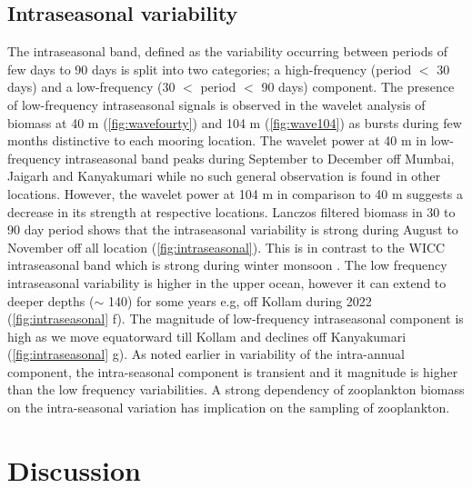 \documentclass{article}
\begin{document}
	\subsection{Intraseasonal variability}
    The intraseasonal band, defined as the variability occurring between periods of few days to 90 days is split into two categories; a high-frequency (period $<$ 30 days) and a low-frequency (30 $<$ period $<$ 90 days) component. The presence of low-frequency intraseasonal signals is observed in the wavelet analysis of biomass at 40 m (\cref{fig:wavefourty}) and 104 m (\cref{fig:wave104}) as bursts during few months distinctive to each mooring location. The wavelet power at 40 m in low-frequency intraseasonal band peaks during September to December off Mumbai, Jaigarh and Kanyakumari while no such general observation is found in other locations. However, the wavelet power at 104 m in comparison to 40 m suggests a decrease in its strength at respective locations. Lanczos filtered biomass in 30 to 90 day period shows that the intraseasonal variability is strong during August to November off all location (\cref{fig:intraseasonal}). This is in contrast to the WICC intraseasonal band which is strong during winter monsoon \citep{amol2014observed, chaudhuri2020observed}. The low frequency intraseasonal variability is higher in the upper ocean, however it can extend to deeper depths ($\sim$ 140) for some years e.g, off Kollam during 2022 (\cref{fig:intraseasonal} f). The magnitude of low-frequency intraseasonal component is high as we move equatorward till Kollam and declines off Kanyakumari (\cref{fig:intraseasonal} g). As noted earlier in variability of the intra-annual component, the intra-seasonal component is transient and it magnitude is higher than the low frequency variabilities. A strong dependency of zooplankton biomass on the intra-seasonal variation has implication on the sampling of zooplankton. 
    	
	\section{Discussion}
	
\end{document}
